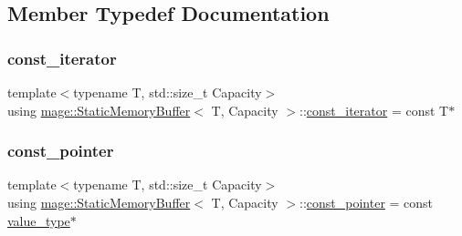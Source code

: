 \subsection{Member Typedef Documentation}
\mbox{\label{classmage_1_1_static_memory_buffer_aa871d2967d2e9f4219ab47c16563e328}} 
\subsubsection{\texorpdfstring{const\+\_\+iterator}{const\_iterator}}
{\footnotesize\ttfamily template$<$typename T, std\+::size\+\_\+t Capacity$>$ \\
using \mbox{\hyperlink{classmage_1_1_static_memory_buffer}{mage\+::\+Static\+Memory\+Buffer}}$<$ T, Capacity $>$\+::\mbox{\hyperlink{classmage_1_1_static_memory_buffer_aa871d2967d2e9f4219ab47c16563e328}{const\+\_\+iterator}} =  const T$\ast$}

\mbox{\label{classmage_1_1_static_memory_buffer_adcb995de3155e5c1fb8c796465094577}} 
\subsubsection{\texorpdfstring{const\+\_\+pointer}{const\_pointer}}
{\footnotesize\ttfamily template$<$typename T, std\+::size\+\_\+t Capacity$>$ \\
using \mbox{\hyperlink{classmage_1_1_static_memory_buffer}{mage\+::\+Static\+Memory\+Buffer}}$<$ T, Capacity $>$\+::\mbox{\hyperlink{classmage_1_1_static_memory_buffer_adcb995de3155e5c1fb8c796465094577}{const\+\_\+pointer}} =  const \mbox{\hyperlink{classmage_1_1_static_memory_buffer_a30a2fd97f8f458d752581dd69e717a97}{value\+\_\+type}}$\ast$}

\mbox{\label{classmage_1_1_static_memory_buffer_a2d961d7baf56ebc96e1e48579bcdcb84}} 
